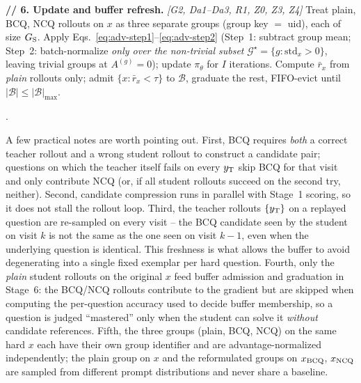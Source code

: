 \documentclass{llmxive}
\begin{document}
\begin{algorithm*}[!htbp]
\textbf{// 6. Update and buffer refresh.} \textit{[G2, Da1--Da3, R1, Z0, Z3, Z4]}\;
Treat plain, BCQ, NCQ rollouts on $x$ as three separate groups (group key $=$ uid), each of size $G_{\rm S}$. Apply Eqs.~\eqref{eq:adv-step1}--\eqref{eq:adv-step2} (Step~1: subtract group mean; Step~2: batch-normalize \emph{only over the non-trivial subset} $\mathcal{G}^{\star}\!=\!\{g\!:\!\mathrm{std}_x\!>\!0\}$, leaving trivial groups at $A^{(g)}\!=\!0$); update $\pi_\theta$ for $I$ iterations.\;
Compute $\bar{r}_x$ from \emph{plain} rollouts only; admit $\{x:\bar{r}_x\!<\!\tau\}$ to $\mathcal{B}$, graduate the rest, FIFO-evict until $|\mathcal{B}|\!\leq\!|\mathcal{B}|_{\max}$.\;

.
\caption{ZPPO training step. Tags: G1--G2 from GRPO~\citep{shao2024deepseekmath}, Da1--Da3 from DAPO~\citep{yu2025dapo}, R1 from REINFORCE++~\citep{hu2025reinforce++}; Z0 marks our recipe choice on top of REINFORCE++ (zero-advantage-group exclusion); Z1--Z4 are ZPPO's contributions (BCQ, NCQ, prompt replay buffer, and their super-additive combination).}
\label{alg:zppo}
\end{algorithm*}

A few practical notes are worth pointing out. First, BCQ requires \emph{both} a correct teacher rollout and a wrong student rollout to construct a candidate pair; questions on which the teacher itself fails on every $y_{\rm T}$ skip BCQ for that visit and only contribute NCQ (or, if all student rollouts succeed on the second try, neither). Second, candidate compression runs in parallel with Stage~1 scoring, so it does not stall the rollout loop. Third, the teacher rollouts $\{y_{\rm T}\}$ on a replayed question are re-sampled on every visit -- the BCQ candidate seen by the student on visit $k$ is not the same as the one seen on visit $k\!-\!1$, even when the underlying question is identical. This freshness is what allows the buffer to avoid degenerating into a single fixed exemplar per hard question. Fourth, only the \emph{plain} student rollouts on the original $x$ feed buffer admission and graduation in Stage~6: the BCQ/NCQ rollouts contribute to the gradient but are skipped when computing the per-question accuracy used to decide buffer membership, so a question is judged ``mastered'' only when the student can solve it \emph{without} candidate references. Fifth, the three groups (plain, BCQ, NCQ) on the same hard $x$ each have their own group identifier and are advantage-normalized independently; the plain group on $x$ and the reformulated groups on $x_{\rm BCQ}$, $x_{\rm NCQ}$ are sampled from different prompt distributions and never share a baseline.
\end{document}
